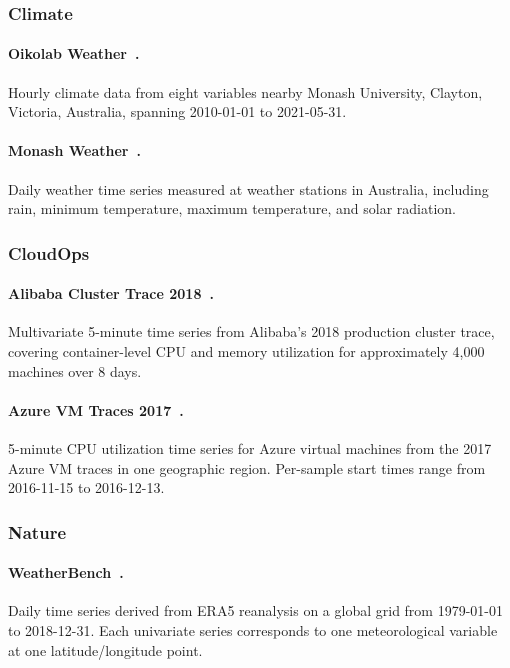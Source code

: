 \documentclass[11pt]{article}
\begin{document}
\subsubsection{Climate}

\paragraph{Oikolab Weather~\citep{woo2024unified}.}
Hourly climate data from eight variables nearby Monash University, Clayton, Victoria, Australia, spanning 2010-01-01 to 2021-05-31.

\paragraph{Monash Weather~\citep{godahewa2021monash}.}
Daily weather time series measured at weather stations in Australia, including rain, minimum temperature, maximum temperature, and solar radiation.

\subsubsection{CloudOps}

\paragraph{Alibaba Cluster Trace 2018~\citep{woo2023pushing}.}
Multivariate 5-minute time series from Alibaba's 2018 production cluster trace, covering container-level CPU and memory utilization for approximately 4{,}000 machines over 8 days.

\paragraph{Azure VM Traces 2017~\citep{woo2023pushing}.}
5-minute CPU utilization time series for Azure virtual machines from the 2017 Azure VM traces in one geographic region. Per-sample start times range from 2016-11-15 to 2016-12-13.

\subsubsection{Nature}

\paragraph{WeatherBench~\citep{rasp2020weatherbench}.}
Daily time series derived from ERA5 reanalysis on a global grid from 1979-01-01 to 2018-12-31.
Each univariate series corresponds to one meteorological variable at one latitude/longitude point.
\end{document}
